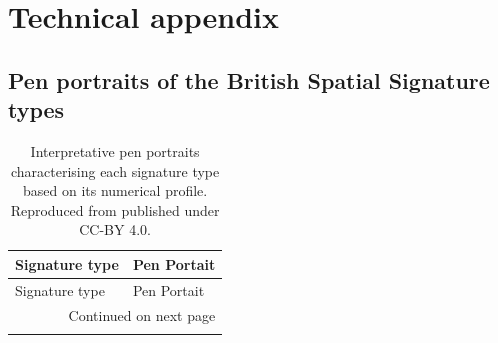 \appendix
\section{Technical appendix}
\label{sec:appendix}

\subsection{Pen portraits of the British Spatial Signature types}
\label{sec:appendixD}

\begin{longtable}{p{}p{}}
    \caption{\label{tab:pens}Interpretative pen portraits characterising each signature type based on its numerical profile. Reproduced from \cite{fleischmann2022geographical} published under CC-BY 4.0.}\\

    \toprule
    Signature type &                                                                                                                                                                                                                                                                                                                                                                                                                             Pen Portait \\
    \midrule
    \endfirsthead

    \toprule
    Signature type &                                                                                                                                                                                                                                                                                                                                                                                                                             Pen Portait \\
    \midrule
    \endhead
    \midrule
    \multicolumn{2}{r}{{Continued on next page}} \\
    \midrule
    \endfoot

    \bottomrule
    \endlastfoot


\end{longtable}
